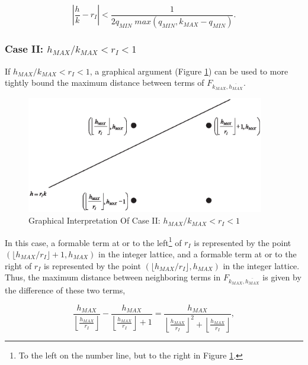 \begin{equation}
\label{eq:qminmaxplacementerror}
\left| {\frac{h}{k} - r_I}  \right|
<
\frac{1}{2q_{MIN} \; max(q_{MIN}, k_{MAX} - q_{MIN})} .
\end{equation}


\subsubsection[Case II:  $h_{MAX}/k_{MAX} < r_I < 1$]
              {Case II:  \mbox{\boldmath $h_{MAX}/k_{MAX} < r_I < 1$}}

If $h_{MAX}/k_{MAX} < r_I < 1$, a graphical argument
(Figure \ref{fig:cfry0:schk0:caseii}) can be used
to more tightly bound the maximum distance between terms of
$F_{k_{MAX}, \overline{h_{MAX}}}$.

\begin{figure}
\centering
\includegraphics[height=2.0in]{c_fry0/errcase2.eps}
\caption{Graphical Interpretation Of Case II:  $h_{MAX}/k_{MAX} < r_I < 1$}
\label{fig:cfry0:schk0:caseii}
\end{figure}

In this case,  a formable term at or to the left\footnote{To the left on the
number line, but to the right in Figure \ref{fig:cfry0:schk0:caseii}.}
of $r_I$ is represented by the point $(\lfloor h_{MAX}/r_I \rfloor + 1, h_{MAX} )$
in the integer lattice,
and a formable term at or to the right of $r_I$ is
represented by the point $(\lfloor h_{MAX}/r_I \rfloor, h_{MAX} )$
in the integer lattice.  Thus, the maximum distance between
neighboring terms in $F_{k_{MAX}, \overline{h_{MAX}}}$
is given by the difference of these two terms,

\begin{equation}
\frac{h_{MAX}}{\left\lfloor {\frac{h_{MAX}}{r_I}} \right\rfloor}
-
\frac{h_{MAX}}{\left\lfloor {\frac{h_{MAX}}{r_I}} \right\rfloor + 1}
=
\frac{h_{MAX}}{{\left\lfloor {\frac{h_{MAX}}{r_I}} \right\rfloor}^2
+ \left\lfloor {\frac{h_{MAX}}{r_I}} \right\rfloor},
\end{equation}

